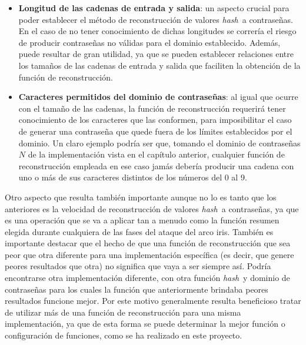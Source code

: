\documentclass[12pt,spanish,listoffigures,listoftables,listofalgorithms]{tfgetsinf}
\newcommand{\hash}{\textit{hash}}
\begin{document}
\begin{itemize}

    \item \textbf{Longitud de las cadenas de entrada y salida}: un aspecto crucial para poder establecer el método de reconstrucción de valores \hash~a contraseñas. En el caso de no tener conocimiento de dichas longitudes se correría el riesgo de producir contraseñas no válidas para el dominio establecido. Además, puede resultar de gran utilidad, ya que se pueden establecer relaciones entre los tamaños de las cadenas de entrada y salida que faciliten la obtención de la función de reconstrucción. 
    
    \item \textbf{Caracteres permitidos del dominio de contraseñas}: al igual que ocurre con el tamaño de las cadenas, la función de reconstrucción requerirá tener conocimiento de los caracteres que las conformen, para imposibilitar el caso de generar una contraseña que quede fuera de los límites establecidos por el dominio. Un claro ejemplo podría ser que, tomando el dominio de contraseñas $N$ de la implementación vista en el capítulo anterior, cualquier función de reconstrucción empleada en ese caso jamás debería producir una cadena con uno o más de sus caracteres distintos de los números del 0 al 9.
    
\end{itemize}

Otro aspecto que resulta también importante aunque no lo es tanto que los anteriores es la velocidad de reconstrucción de valores \hash~a contraseñas, ya que es una operación que se va a aplicar tan a menudo como la función resumen elegida durante cualquiera de las fases del ataque del arco iris. También es importante destacar que el hecho de que una función de reconstrucción que sea peor que otra diferente para una implementación específica (es decir, que genere peores resultados que otra) no significa que vaya a ser siempre así. Podría encontrarse otra implementación diferente, con otra función \hash~y dominio de contraseñas para los cuales la función que anteriormente brindaba peores resultados funcione mejor. Por este motivo generalmente resulta beneficioso tratar de utilizar más de una función de reconstrucción para una misma implementación, ya que de esta forma se puede determinar la mejor función o configuración de funciones, como se ha realizado en este proyecto.
\end{document}
